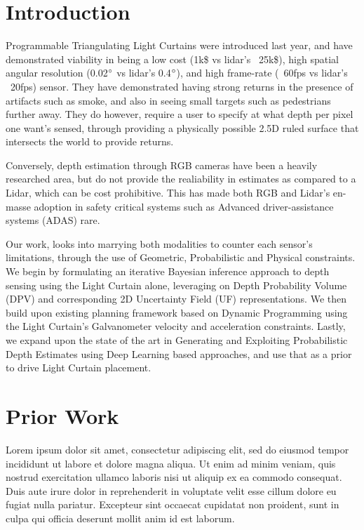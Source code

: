 \documentclass[review]{cvpr}
\begin{document}
\section{Introduction}

Programmable Triangulating Light Curtains were introduced last year, and have demonstrated viability in being a low cost (1k\$ vs lidar's ~25k\$), high spatial angular resolution (0.02$\degree$ vs lidar's  0.4$\degree$), and high frame-rate (~60fps vs lidar's ~20fps) sensor. They have demonstrated having strong returns in the presence of artifacts such as smoke, and also in seeing small targets such as pedestrians further away. They do however, require a user to specify at what depth per pixel one want's sensed, through providing a physically possible 2.5D ruled surface that intersects the world to provide returns. 

Conversely, depth estimation through RGB cameras have been a heavily researched area, but do not provide the realiability in estimates as compared to a Lidar, which can be cost prohibitive. This has made both RGB and Lidar's en-masse adoption in safety critical systems such as Advanced driver-assistance systems (ADAS) rare. 

Our work, looks into marrying both modalities to counter each sensor's limitations, through the use of Geometric, Probabilistic and Physical constraints. We begin by formulating an iterative Bayesian inference approach to depth sensing using the Light Curtain alone, leveraging on Depth Probability Volume (DPV) and corresponding 2D Uncertainty Field (UF) representations. We then build upon existing planning framework based on Dynamic Programming using the Light Curtain's Galvanometer velocity and acceleration constraints. Lastly, we expand upon the state of the art in Generating and Exploiting Probabilistic Depth Estimates using Deep Learning based approaches, and use that as a prior to drive Light Curtain placement.

\section{Prior Work}

Lorem ipsum dolor sit amet, consectetur adipiscing elit, sed do eiusmod tempor incididunt ut labore et dolore magna aliqua. Ut enim ad minim veniam, quis nostrud exercitation ullamco laboris nisi ut aliquip ex ea commodo consequat. Duis aute irure dolor in reprehenderit in voluptate velit esse cillum dolore eu fugiat nulla pariatur. Excepteur sint occaecat cupidatat non proident, sunt in culpa qui officia deserunt mollit anim id est laborum. \cite{wang2018programmable} \cite{bartels2019Agile}
\end{document}
